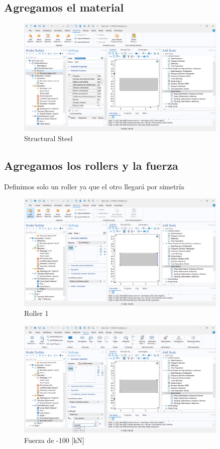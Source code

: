 \documentclass{article}
\theoremstyle{mytheoremstyle}
\theoremstyle{mytheoremstyle}
\theoremstyle{myproblemstyle}
\begin{document}
            \subsection{Agregamos el material}
             \begin{figure}[H]
              \centering
              \includegraphics[width=0.9\textwidth]{mat.png}
              \caption{Structural Steel}
              \label{fig:comsol_material}
            \end{figure}
  \subsection{Agregamos los rollers y la fuerza}
  Definimos solo un roller ya que el otro llegará por simetría
             \begin{figure}[H]
              \centering
              \includegraphics[width=0.9\textwidth]{roll1.png}
              \caption{Roller 1}
              \label{fig:comsol_roller1}
            \end{figure}

            \begin{figure}[H]
              \centering
              \includegraphics[width=0.9\textwidth]{force.png}
              \caption{Fuerza de -100 [kN]}
              \label{fig:comsol_fuerza}
            \end{figure}
\end{document}
